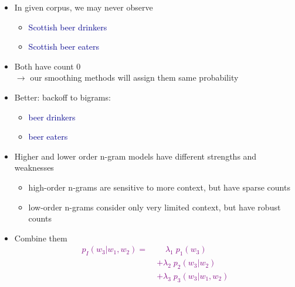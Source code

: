 \documentclass[landscape]{slides}
\newcommand{\example}[1]{\textcolor{darkblue}{\rm #1}}
\newcommand{\maths}[1]{\textcolor{purple}{#1}}
\begin{document}

\vspace{15mm}
\begin{itemize}
\item In given corpus, we may never observe
\begin{itemize}
\item \example{Scottish beer drinkers}
\item \example{Scottish beer eaters}
\end{itemize}
\item Both have count 0\\[2mm] 
$\rightarrow$ our smoothing methods will assign them same probability
\item Better: backoff to bigrams:
\begin{itemize}
\item \example{beer drinkers}
\item \example{beer eaters}
\end{itemize}
\end{itemize}



\vspace{15mm}
\begin{itemize}
\item Higher and lower order n-gram models have different strengths and weaknesses
\begin{itemize}
\item high-order n-grams are sensitive to more context, but have sparse counts
\item low-order n-grams consider only very limited context, but have robust counts
\end{itemize}
\item Combine them
\maths{\begin{equation*}
\begin{split}
p_I(w_3|w_1,w_2) = \; & \phantom{\times \;} \lambda_1 \; p_1(w_3) \\
& + \lambda_2 \; p_2(w_3|w_2) \\
& + \lambda_3 \; p_3(w_3|w_1,w_2)
\end{split}
\end{equation*}}
\end{itemize}

\end{document}
